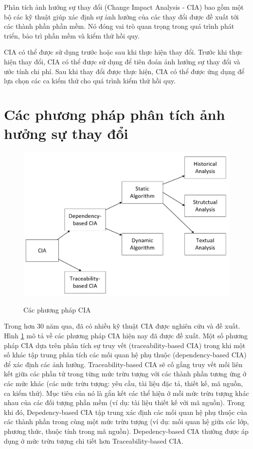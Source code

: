 \documentclass[12pt]{report}
\begin{document}
Phân tích ảnh hưởng sự thay đổi (Change Impact Analysis - CIA) bao gồm một bộ các kỹ thuật giúp xác định sự ảnh hưởng của các thay đổi được đề xuất tới các thành phần phần mềm. Nó đóng vai trò quan trọng trong quá trình phát triển, bảo trì phần mềm và kiểm thử hồi quy.

CIA có thể được sử dụng trước hoặc sau khi thực hiện thay đổi. Trước khi thực hiện thay đổi, CIA có thể được sử dụng để tiên đoán ảnh hưởng sự thay đổi và ước tính chi phí. Sau khi thay đổi được thực hiện, CIA có thể được ứng dụng để lựa chọn các ca kiểm thử cho quá trình kiểm thử hồi quy.

\section{Các phương pháp phân tích ảnh hưởng sự thay đổi}
\begin{figure}[h]
	\centering
	\includegraphics[scale=0.5]{CIA-hierarchy}
	\label{fig:cia-hierarchy}
	\caption{Các phương pháp CIA}
\end{figure}

Trong hơn 30 năm qua, đã có nhiều kỹ thuật CIA được nghiên cứu và đề xuất. Hình \ref{fig:cia-hierarchy} mô tả về các phương pháp CIA hiện nay đã được đề xuất. Một số phương pháp CIA dựa trên phân tích sự truy vết (traceability-based CIA) trong khi một số khác tập trung phân tích các mối quan hệ phụ thuộc (dependency-based CIA) để xác định các ảnh hưởng. Traceability-based CIA sẽ cố gắng truy vết mối liên kết giữa các phần tử trong từng mức trừu tượng với các thành phần tương ứng ở các mức khác (các mức trừu tượng: yêu cầu, tài liệu đặc tả, thiết kế, mã nguồn, ca kiểm thử). Mục tiêu của nó là gắn kết các thể hiện ở mỗi mức trừu tượng khác nhau của các đối tượng phần mềm (ví dụ: tài liệu thiết kế với mã nguồn). Trong khi đó, Depedency-based CIA tập trung xác định các mối quan hệ phụ thuộc của các thành phần trong cùng một mức trừu tượng (ví dụ: mối quan hệ giữa các lớp, phương thức, thuộc tính trong mã nguồn). Depedency-based CIA thường được áp dụng ở mức trừu tượng chi tiết hơn Traceability-based CIA.
\end{document}
